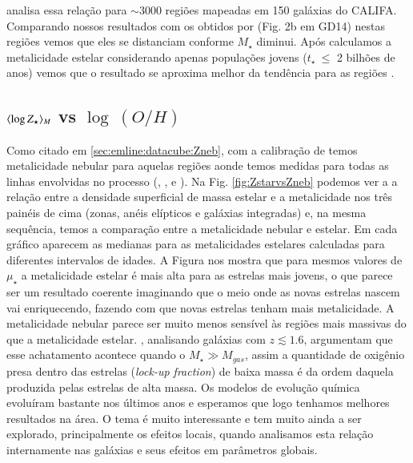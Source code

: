 \citet{Sanchez.etal.2013a} analisa essa relação para $\sim 3000$ regiões \Hii mapeadas em 150
galáxias do CALIFA. Comparando nossos resultados com os obtidos por \citeauthor{Sanchez.etal.2013a}
(Fig. 2b em GD14) nestas regiões vemos que eles se distanciam conforme $M_\star$ diminui.
Após calculamos a metalicidade estelar considerando apenas populações jovens ($t_\star\ \leq$ 2
bilhões de anos) vemos que o resultado se aproxima melhor da tendência para as regiões \Hii.

\subsection{$\meanM{\log Z_\star}$ vs $\log\ (O/H)$}
\label{sec:synvsneb:ZemuZR}

Como citado em \ref{sec:emline:datacube:Zneb}, com a calibração de \citet{Marino.etal.2013a} temos
metalicidade nebular para aquelas regiões aonde temos medidas para todas as linhas envolvidas no
processo (\Hbeta, \oIII, \Halpha e \nII). Na Fig. \ref{fig:ZstarvsZneb} podemos ver a a relação
entre a densidade superficial de massa estelar e a metalicidade nos três painéis de cima (zonas,
anéis elípticos e galáxias integradas) e, na mesma sequência, temos a comparação entre a
metalicidade nebular e estelar. Em cada gráfico aparecem as medianas para as metalicidades estelares
calculadas para diferentes intervalos de idades. A Figura nos mostra que para mesmos valores de
$\mu_\star$ a metalicidade estelar é mais alta para as estrelas mais jovens, o que parece ser um
resultado coerente imaginando que o meio onde as novas estrelas nascem vai enriquecendo, fazendo com
que novas estrelas tenham mais metalicidade. A metalicidade nebular parece ser muito menos sensível
às regiões mais massivas do que a metalicidade estelar. \citet{Zahid.etal.2014a}, analisando
galáxias com $z \lesssim 1.6$, argumentam que esse achatamento acontece quando o $M_\star \gg
M_{gas}$, assim a quantidade de oxigênio presa dentro das estrelas ({\em lock-up fraction}) de baixa
massa é da ordem daquela produzida pelas estrelas de alta massa. Os modelos de evolução química
evoluíram bastante nos últimos anos \citep[e.g., ][]{Lilly.etal.2013a, Peng.Maiolino.2014a,
Ascasibar.etal.2015a, Peng.Maiolino.Cochrane.2015a} e esperamos que logo tenhamos melhores
resultados na área. O tema é muito interessante e tem muito ainda a ser explorado, principalmente os
efeitos locais, quando analisamos esta relação internamente nas galáxias e seus efeitos em
parâmetros globais.

